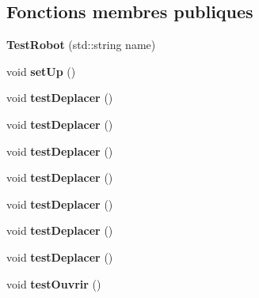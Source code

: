 \subsection*{Fonctions membres publiques}
\begin{DoxyCompactItemize}
\item 
\hypertarget{classTestRobot_a7a6f81e1509401afb6086073f142e059}{}{\bfseries Test\+Robot} (std\+::string name)\label{classTestRobot_a7a6f81e1509401afb6086073f142e059}

\item 
\hypertarget{classTestRobot_a29a7e512cf6a7c9871d0986f38ecd0ee}{}void {\bfseries set\+Up} ()\label{classTestRobot_a29a7e512cf6a7c9871d0986f38ecd0ee}

\item 
\hypertarget{classTestRobot_a8131b7d6df6b37c251c12c3a76a6f422}{}void {\bfseries test\+Deplacer} ()\label{classTestRobot_a8131b7d6df6b37c251c12c3a76a6f422}

\item 
\hypertarget{classTestRobot_a8131b7d6df6b37c251c12c3a76a6f422}{}void {\bfseries test\+Deplacer} ()\label{classTestRobot_a8131b7d6df6b37c251c12c3a76a6f422}

\item 
\hypertarget{classTestRobot_a8131b7d6df6b37c251c12c3a76a6f422}{}void {\bfseries test\+Deplacer} ()\label{classTestRobot_a8131b7d6df6b37c251c12c3a76a6f422}

\item 
\hypertarget{classTestRobot_a8131b7d6df6b37c251c12c3a76a6f422}{}void {\bfseries test\+Deplacer} ()\label{classTestRobot_a8131b7d6df6b37c251c12c3a76a6f422}

\item 
\hypertarget{classTestRobot_a8131b7d6df6b37c251c12c3a76a6f422}{}void {\bfseries test\+Deplacer} ()\label{classTestRobot_a8131b7d6df6b37c251c12c3a76a6f422}

\item 
\hypertarget{classTestRobot_a8131b7d6df6b37c251c12c3a76a6f422}{}void {\bfseries test\+Deplacer} ()\label{classTestRobot_a8131b7d6df6b37c251c12c3a76a6f422}

\item 
\hypertarget{classTestRobot_a8131b7d6df6b37c251c12c3a76a6f422}{}void {\bfseries test\+Deplacer} ()\label{classTestRobot_a8131b7d6df6b37c251c12c3a76a6f422}

\item 
\hypertarget{classTestRobot_a6d976a0403c5d0ad6ed217dc81fc52d9}{}void {\bfseries test\+Ouvrir} ()\label{classTestRobot_a6d976a0403c5d0ad6ed217dc81fc52d9}


\end{DoxyCompactItemize}

